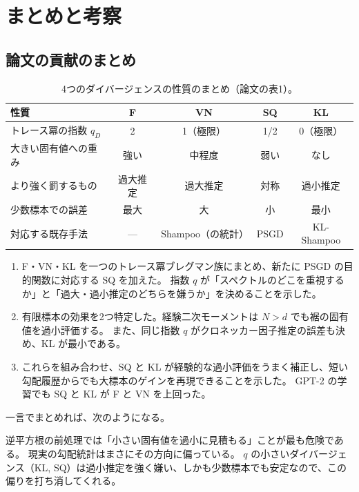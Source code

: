 \documentclass[a4paper,11pt]{ltjsarticle}
\theoremstyle{definition}
\theoremstyle{plain}
\begin{document}
\section{まとめと考察}

\subsection{論文の貢献のまとめ}

\begin{table}[h]
\centering
\caption{4つのダイバージェンスの性質のまとめ（論文の表1）。}
\label{tab:summary}
\renewcommand{\arraystretch}{1.25}
\begin{tabular}{lcccc}
\toprule
性質 & F & VN & SQ & KL\\\midrule
トレース冪の指数 $q_D$ & 2 & 1（極限） & 1/2 & 0（極限）\\
大きい固有値への重み & 強い & 中程度 & 弱い & なし\\
より強く罰するもの & 過大推定 & 過大推定 & 対称 & 過小推定\\
少数標本での誤差 & 最大 & 大 & 小 & 最小\\
対応する既存手法 & --- & Shampoo（の統計） & PSGD & KL-Shampoo\\
\bottomrule
\end{tabular}
\end{table}

\begin{enumerate}
  \item[(C1)] F・VN・KL を一つのトレース冪ブレグマン族にまとめ、新たに PSGD の目的関数に対応する SQ を加えた。
              指数 $q$ が「スペクトルのどこを重視するか」と「過大・過小推定のどちらを嫌うか」を決めることを示した。
  \item[(C2)] 有限標本の効果を2つ特定した。経験二次モーメントは $N>d$ でも裾の固有値を過小評価する。
              また、同じ指数 $q$ がクロネッカー因子推定の誤差も決め、KL が最小である。
  \item[(C3)] これらを組み合わせ、SQ と KL が経験的な過小評価をうまく補正し、短い勾配履歴からでも大標本のゲインを再現できることを示した。
              GPT-2 の学習でも SQ と KL が F と VN を上回った。
\end{enumerate}

一言でまとめれば、次のようになる。

\begin{pointbox}[一言で]
逆平方根の前処理では「小さい固有値を過小に見積もる」ことが最も危険である。
現実の勾配統計はまさにその方向に偏っている。
$q$ の小さいダイバージェンス（KL, SQ）は過小推定を強く嫌い、しかも少数標本でも安定なので、この偏りを打ち消してくれる。
\end{pointbox}
\end{document}
